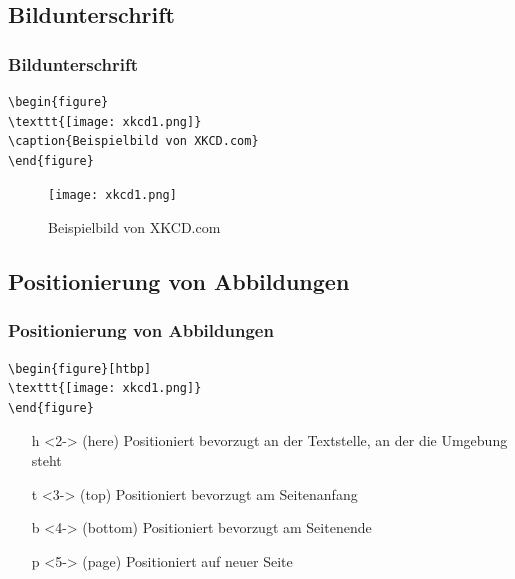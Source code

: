 \subsection{Bildunterschrift}
\begin{frame}[fragile]
\frametitle{Bildunterschrift}
 
\begin{codeblock}
\begin{verbatim}
\begin{figure}
\texttt{[image: xkcd1.png]}
\caption{Beispielbild von XKCD.com}
\end{figure}
\end{verbatim}
\end{codeblock}
    \begin{figure}
      \texttt{[image: xkcd1.png]}
      \caption{Beispielbild von XKCD.com}
    \end{figure}
\end{frame}

\subsection{Positionierung von Abbildungen}
\begin{frame}[fragile]
\frametitle{Positionierung von Abbildungen}
  \begin{codeblock}
\begin{verbatim}
\begin{figure}[htbp]
\texttt{[image: xkcd1.png]}
\end{figure}
\end{verbatim}
  \end{codeblock}
  
  \begin{itemize}
    \item[h]<2-> (here) Positioniert bevorzugt an der Textstelle, an der
die Umgebung steht
    \item[t]<3-> (top) Positioniert bevorzugt am Seitenanfang
    \item[b]<4-> (bottom) Positioniert bevorzugt am Seitenende
    \item[p]<5-> (page) Positioniert auf neuer Seite
  \end{itemize}
\end{frame}